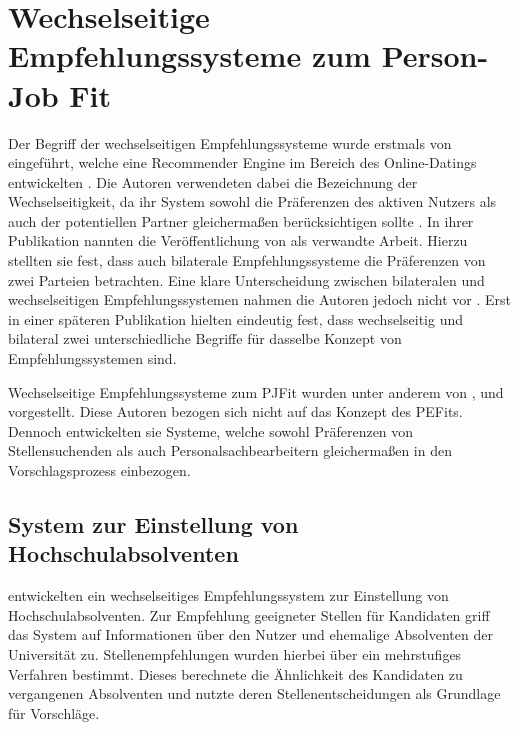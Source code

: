 \section{Wechselseitige Empfehlungssysteme zum Person-Job Fit}
\label{ch:verwandteArbeiten:nichtAufDemPEFitBasierendeBilateraleSysteme}
Der Begriff der wechselseitigen Empfehlungssysteme wurde erstmals von \textcite[S. 1]{pizzato:2010} eingeführt, welche eine Recommender Engine im Bereich des Online-Datings entwickelten \cite[S. 1]{wenxing:2015}. Die Autoren verwendeten dabei die Bezeichnung der Wechselseitigkeit, da ihr System sowohl die Präferenzen des aktiven Nutzers als auch der potentiellen Partner gleichermaßen berücksichtigen sollte \cite[S. 1]{pizzato:2010}. In ihrer Publikation nannten \textcite[S. 3]{pizzato:2010} die Veröffentlichung von \textcite[S. 1ff.]{malinowski:2006} als verwandte Arbeit. Hierzu stellten sie fest, dass auch bilaterale Empfehlungssysteme die Präferenzen von zwei Parteien betrachten. Eine klare Unterscheidung zwischen bilateralen und wechselseitigen Empfehlungssystemen nahmen die Autoren jedoch nicht vor \cite[S. 3]{pizzato:2010}. Erst in einer späteren Publikation hielten \textcite[S. 8]{pizzato:2013} eindeutig fest, dass wechselseitig und bilateral zwei unterschiedliche Begriffe für dasselbe Konzept von Empfehlungssystemen sind.

Wechselseitige Empfehlungssysteme zum \ac{PJFit} wurden unter anderem von \textcite[S. 1ff.]{ding:2016}, \textcite[S. 1ff.]{wenxing:2015} und \textcite[S. 1ff.]{lu:2013} vorgestellt. Diese Autoren bezogen sich nicht auf das Konzept des \acp{PEFit}. Dennoch entwickelten sie Systeme, welche sowohl Präferenzen von Stellensuchenden als auch Personalsachbearbeitern gleichermaßen in den Vorschlagsprozess einbezogen. 

\subsection{System zur Einstellung von Hochschulabsolventen}
\label{ch:verwandteArbeiten:nichtAufDemPEFitBasierendeBilateraleSysteme:absolventen}
\textcite[S. 1ff.]{ding:2016} entwickelten ein wechselseitiges Empfehlungssystem zur Einstellung von Hochschulabsolventen. Zur Empfehlung geeigneter Stellen für Kandidaten griff das System auf Informationen über den Nutzer und ehemalige Absolventen der Universität zu. Stellenempfehlungen wurden hierbei über ein mehrstufiges Verfahren bestimmt. Dieses berechnete die Ähnlichkeit des Kandidaten zu vergangenen Absolventen und nutzte deren Stellenentscheidungen als Grundlage für Vorschläge.


